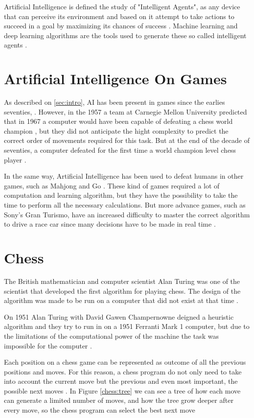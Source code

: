 \documentclass[conference]{IEEEtran}
\begin{document}
Artificial Intelligence is defined the study of "Intelligent Agents", as any device that can perceive its environment and based on it attempt to take actions to succeed in a goal by maximizing its chances of success \cite{ai}. Machine learning and deep learning algorithms are the tools used to generate these so called intelligent agents \cite{ai}.


\section{Artificial Intelligence On Games}

As described on \ref{sec:intro}, AI has been present in games since the earlies seventies, 
\cite{sony}. However, in the 1957  a team at Carnegie Mellon University predicted that in 1967 a computer would have been capable of defeating a chess world champion \cite{euristic}, but they did not anticipate the hight complexity to predict the correct order of movements required for this task. But at the end of the decade of seventies, a computer defeated for the first time a world champion level chess player \cite{bad}.

In the same way, Artificial Intelligence has been used to defeat humans in other games, such as Mahjong and Go \cite{sony}. These kind of games required a lot of computation and learning algorithm, but they have the possibility to take the time to perform all the necessary calculations. But more advance games, such as Sony's Gran Turismo, have an increased difficulty to master the correct algorithm to drive a race car since many decisions have to be made in real time \cite{sony}.

\section{Chess}\label{sec:chess}

The British mathematician and computer scientist Alan Turing was one of the scientist that developed the first algorithm for playing chess. The design of the algorithm was made to be run on a computer that did not exist at that time \cite{how}.

On 1951 Alan Turing with David Gawen Champernowne deigned a heuristic algorithm and they try to run in on a 1951 Ferranti Mark 1 computer, but due to the limitations of the computational power of the machine the task was impossible for the computer \cite{how}.

Each position on a chess game can be represented as outcome of all the previous positions and moves. For this reason, a chess program do not only need to take into account the current move but the previous and even most important, the possible next moves \cite{how}. In Figure \ref{chess:tree} we can see a tree of how each move can generate a limited number of moves, and how the tree grow deeper after every move, so the chess program can select the best next move \cite{how}
\end{document}
